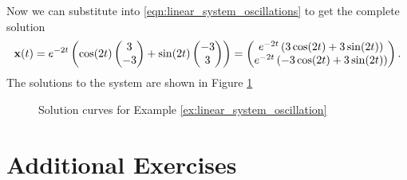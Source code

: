 \begin{example}
    Now we can substitute into \eqref{eqn:linear_system_oscillations} to get the complete
    solution
    \[ {\bf x}(t) = e^{-2t} \left( \cos(2t) \begin{pmatrix} 3 \\ -3 \end{pmatrix} + \sin(2t)
    \begin{pmatrix} -3 \\ 3 \end{pmatrix} \right) = \begin{pmatrix} e^{-2t} \left( 3
        \cos(2t) + 3 \sin(2t)
    \right) \\ e^{-2t} \left( -3\cos(2t) + 3\sin(2t) \right) \end{pmatrix}. \]
    The solutions to the system are shown in Figure \ref{fig:linear_system_oscillation}
\end{example}

\begin{figure}
    \begin{center}
    \end{center}
    \caption{Solution curves for Example \ref{ex:linear_system_oscillation}}
    \label{fig:linear_system_oscillation}
\end{figure}


\section{Additional Exercises}

